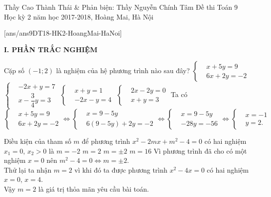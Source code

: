 \begin{name}
{Thầy Cao Thành Thái \& Phản biện: Thầy Nguyễn Chính Tâm}
{Đề thi Toán 9 Học kỳ 2 năm học 2017-2018, Hoàng Mai, Hà Nội}
\end{name}
\setcounter{ex}{0}
[ans/ans9DT18-HK2-HoangMai-HaNoi]

\noindent\textbf{I. PHẦN TRẮC NGHIỆM}

\begin{ex}%
 Cặp số $(-1;2)$ là nghiệm của hệ phương trình nào sau đây?
 \choice
  {\True $\left\{\begin{aligned} & x+5y=9 \\& 6x+2y=-2 \end{aligned}\right.$}
  {$\left\{\begin{aligned} & -2x+y=7 \\& x-\dfrac{3}{4}y=3 \end{aligned}\right.$}
  {$\left\{\begin{aligned} & x+y=1 \\& -2x-y=4 \end{aligned}\right.$}
  {$\left\{\begin{aligned} & 2x-2y=0 \\& x+y=3 \end{aligned}\right.$}
 \loigiai
  {
  Ta có
  \begin{equation*}
   				   \left\{\begin{aligned} & x+5y=9 \\& 6x+2y=-2 \end{aligned}\right.
   \Leftrightarrow \left\{\begin{aligned} & x=9-5y \\& 6(9-5y)+2y=-2 \end{aligned}\right.
   \Leftrightarrow \left\{\begin{aligned} & x=9-5y \\& -28y=-56 \end{aligned}\right.
   \Leftrightarrow \left\{\begin{aligned} & x=-1 \\& y=2. \end{aligned}\right.
  \end{equation*}
  }
\end{ex}

\begin{ex}%
 Điều kiện của tham số $m$ để phương trình $x^2-2mx+m^2-4=0$ có hai nghiệm $x_1=0$, $x_2>0$ là
 \choice
  {$m=-2$}
  {\True $m=2$}
  {$m=\pm 2$}
  {$m=16$}
 \loigiai
  {
  Vì phương trình đã cho có một nghiệm $x=0$ nên $m^2-4=0 \Leftrightarrow m = \pm 2$.\\
  Thử lại ta nhận $m = 2$ vì khi đó ta được phương trình $x^2-4x=0$ có hai nghiệm $x=0$, $x=4$.\\
  Vậy $m=2$ là giá trị thỏa mãn yêu cầu bài toán.
  }
\end{ex}

